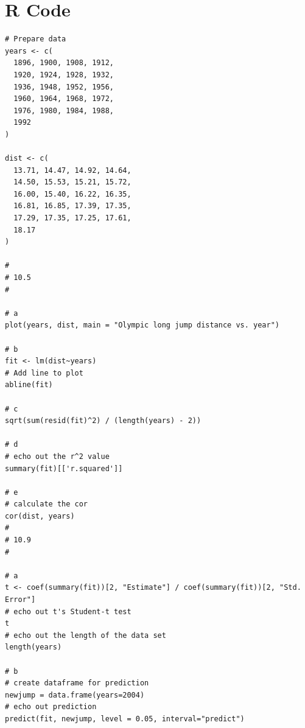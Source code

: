 \documentclass{article}
\begin{document}
\section*{R Code}
\begin{verbatim}
# Prepare data
years <- c(
  1896, 1900, 1908, 1912, 
  1920, 1924, 1928, 1932, 
  1936, 1948, 1952, 1956, 
  1960, 1964, 1968, 1972, 
  1976, 1980, 1984, 1988, 
  1992
)

dist <- c(
  13.71, 14.47, 14.92, 14.64,
  14.50, 15.53, 15.21, 15.72,
  16.00, 15.40, 16.22, 16.35,
  16.81, 16.85, 17.39, 17.35,
  17.29, 17.35, 17.25, 17.61, 
  18.17
)

#
# 10.5
#

# a
plot(years, dist, main = "Olympic long jump distance vs. year")

# b
fit <- lm(dist~years)
# Add line to plot
abline(fit)

# c
sqrt(sum(resid(fit)^2) / (length(years) - 2))

# d
# echo out the r^2 value
summary(fit)[['r.squared']]

# e
# calculate the cor
cor(dist, years)
#
# 10.9
#

# a
t <- coef(summary(fit))[2, "Estimate"] / coef(summary(fit))[2, "Std. Error"]
# echo out t's Student-t test
t
# echo out the length of the data set
length(years)

# b
# create dataframe for prediction
newjump = data.frame(years=2004)
# echo out prediction
predict(fit, newjump, level = 0.05, interval="predict")

\end{verbatim}
\end{document}
